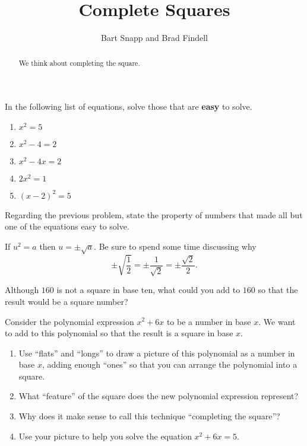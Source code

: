 \documentclass[nooutcomes]{ximera}
\title{Complete Squares}
\author{Bart Snapp and Brad Findell}
\begin{document}
\begin{abstract}
  We think about completing the square.
\end{abstract}
\maketitle

\label{A:completeSquares}

\begin{problem}
In the following list of equations, solve those that are \textbf{easy} to solve.  
\begin{enumerate}
\item $x^2=5$
\item $x^2 - 4 = 2$
\item $x^2 - 4x = 2$
\item $2x^2=1$
\item $(x-2)^2=5$
\end{enumerate}
\end{problem}
\vspace{0.3in}

\begin{problem}
Regarding the previous problem, state the property of numbers that made all but one of the equations easy to solve.  
\begin{teachingnote}
If $u^2=a$ then $u=\pm\sqrt{a}$.  Be sure to spend some time discussing why 
$$\pm\sqrt{\frac{1}{2}}=\pm\frac{1}{\sqrt{2}}=\pm\frac{\sqrt{2}}{2}.$$
\end{teachingnote}
\vspace{0.3in}
\end{problem}

\begin{problem}
Although $160$ is not a square in base ten, what could you add to $160$ so that the result would be a square number?  
\end{problem}

\begin{problem}
 Consider the polynomial expression $x^2+6x$ to be a number in base $x$.  We want to add to this polynomial so that the result is a square in base $x$.  
\begin{enumerate}
\item Use ``flats'' and ``longs'' to draw a picture of this polynomial as a number in base $x$, adding enough ``ones'' so that you can arrange the polynomial into a square.  
\vspace{0.5in}
\item What ``feature'' of the square does the new polynomial expression represent?  
\item Why does it make sense to call this technique ``completing the square''? 
\item Use your picture to help you solve the equation $x^2+6x=5$.  
\end{enumerate}
\end{problem}
\end{document}
